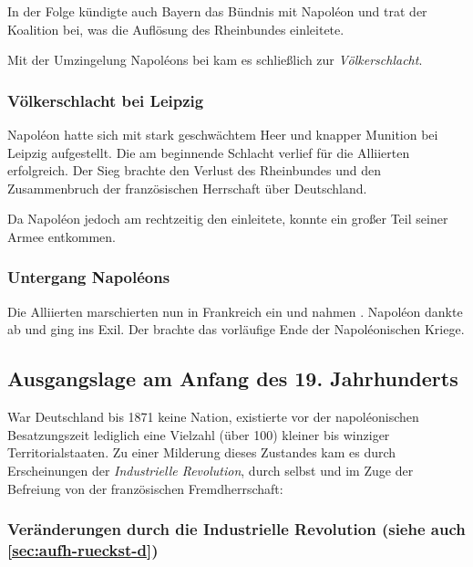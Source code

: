 In der Folge kündigte auch Bayern das Bündnis mit Napol\'eon und trat
der Koalition bei, was die Auflösung des Rheinbundes einleitete.

Mit der Umzingelung Napol\'eons bei  kam es schließlich zur
\emph{Völkerschlacht}.


\subsubsection{Völkerschlacht bei Leipzig}

Napol\'eon hatte sich mit stark geschwächtem Heer und knapper Munition
bei Leipzig aufgestellt. Die am  beginnende
Schlacht verlief für die Alliierten erfolgreich. Der Sieg brachte den
Verlust des Rheinbundes und den Zusammenbruch der französischen
Herrschaft über Deutschland.

Da Napol\'eon jedoch am  rechtzeitig den
 einleitete, konnte ein großer Teil seiner Armee
entkommen.


\subsubsection{Untergang Napol\'eons}

Die Alliierten marschierten nun in Frankreich ein und nahmen
. Napol\'eon dankte ab und ging ins
Exil. Der  brachte das
vorläufige Ende der Napol\'eonischen Kriege.


\subsection{Ausgangslage am Anfang des 19. Jahrhunderts}

War Deutschland bis 1871 keine Nation, existierte vor der
napol\'eonischen Besatzungszeit lediglich eine Vielzahl (über 100)
kleiner bis winziger Territorialstaaten. Zu einer Milderung dieses
Zustandes kam es durch Erscheinungen der \emph{Industrielle
Revolution}, durch  selbst und im
Zuge der Befreiung von der französischen Fremdherrschaft:


\subsubsection[Veränderungen durch die Industrielle
Revolution]{Veränderungen durch die Industrielle Revolution (siehe
auch \ref{sec:aufh-rueckst-d})}

